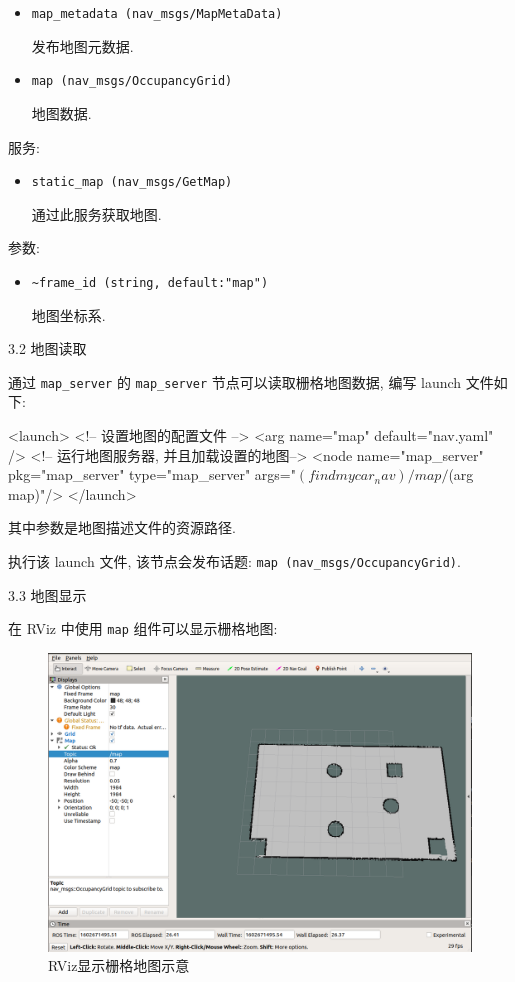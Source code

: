 \documentclass[openany, fontset=windowsold]{ctexbook}
\theoremstyle{kaiti}
\theoremstyle{normal}
\begin{document}
\begin{itemize}
  \item \verb|map_metadata (nav_msgs/MapMetaData)|

  发布地图元数据.

  \item \verb|map (nav_msgs/OccupancyGrid)|

  地图数据.
\end{itemize}

服务:

\begin{itemize}
  \item \verb|static_map (nav_msgs/GetMap)|

  通过此服务获取地图.
\end{itemize}

参数:

\begin{itemize}
  \item \verb|~frame_id (string, default:"map")|

  地图坐标系.
\end{itemize}

3.2 地图读取

通过 \verb|map_server| 的 \verb|map_server| 节点可以读取栅格地图数据, 编写 launch 文件如下:

\begin{xml}
  <launch>
      <!-- 设置地图的配置文件 -->
      <arg name="map" default="nav.yaml" />
      <!-- 运行地图服务器, 并且加载设置的地图-->
      <node name="map_server" pkg="map_server" type="map_server" args="$(find mycar_nav)/map/$(arg map)"/>
  </launch>
\end{xml}

其中参数是地图描述文件的资源路径.

执行该 launch 文件, 该节点会发布话题: \verb|map (nav_msgs/OccupancyGrid)|.

3.3 地图显示

在 RViz 中使用 \verb|map| 组件可以显示栅格地图:

\begin{figure}[!ht]
  \centering
  \includegraphics[width=.9\textwidth]{ros_demo_nav_show_map.png}
  \caption{RViz显示栅格地图示意}
  \label{fig:ros_demo_nav_show_map}
\end{figure}
\end{document}
